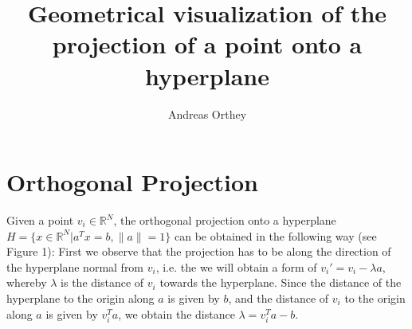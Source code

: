 \documentclass{article}
\begin{document}
\title{Geometrical visualization of the projection of a point onto a hyperplane}
\author{Andreas Orthey}
\date{}
\maketitle

\def\R{\ensuremath{\mathbb{R}}}

\section{Orthogonal Projection}

Given a point $v_i \in \R^N$, the orthogonal projection onto a hyperplane
$H=\{x\in \R^N| a^Tx=b, \|a\|=1\}$ can be obtained in the following way (see
Figure 1): First we observe that the projection has to be along the
direction of the hyperplane normal from $v_i$, i.e. the we will obtain a form of
$v_i' = v_i - \lambda a$, whereby $\lambda$ is the distance of $v_i$ towards the
hyperplane. Since the distance of the hyperplane to the origin along $a$ is
given by $b$, and the distance of $v_i$ to the origin along $a$ is given by
$v_i^Ta$, we obtain the distance $\lambda = v_i^Ta-b$. 
\end{document}
